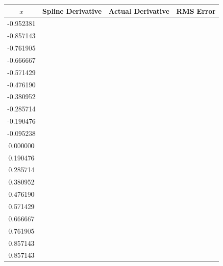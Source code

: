 \documentclass[11pt]{article} %
\begin{document}
\begin{tabular}{| c | c c c |}
\hline
$x$ & Spline Derivative & Actual Derivative & RMS Error\\
\hline
-0.952381 &  &  & \\
-0.857143 &  &  & \\
-0.761905 &  & &  \\
-0.666667 &  & &  \\
-0.571429 &  & &  \\
-0.476190 & & &  \\
-0.380952 &  & &  \\
-0.285714 &  & &  \\
-0.190476 &  & &  \\
-0.095238 &  & &  \\
0.000000 &  & &  \\
0.190476 &  & &  \\
0.285714 & & &  \\
0.380952 &  & &  \\
0.476190 &  & &  \\
0.571429 &  & &  \\
0.666667 &  & &  \\
0.761905 &  & &  \\
0.857143 &  & &  \\
0.857143 &  & &  \\

\hline
\end{tabular}
\end{document}
